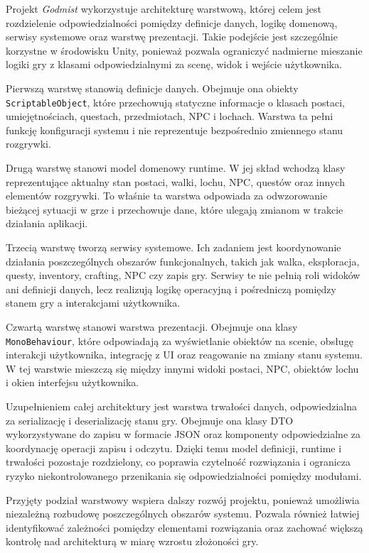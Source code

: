 Projekt \emph{Godmist} wykorzystuje architekturę warstwową, której celem jest rozdzielenie odpowiedzialności pomiędzy definicje danych, logikę domenową, serwisy systemowe oraz warstwę prezentacji. Takie podejście jest szczególnie korzystne w środowisku Unity, ponieważ pozwala ograniczyć nadmierne mieszanie logiki gry z klasami odpowiedzialnymi za scenę, widok i wejście użytkownika.

Pierwszą warstwę stanowią definicje danych. Obejmuje ona obiekty \texttt{ScriptableObject}, które przechowują statyczne informacje o klasach postaci, umiejętnościach, questach, przedmiotach, NPC i lochach. Warstwa ta pełni funkcję konfiguracji systemu i nie reprezentuje bezpośrednio zmiennego stanu rozgrywki.

Drugą warstwę stanowi model domenowy runtime. W jej skład wchodzą klasy reprezentujące aktualny stan postaci, walki, lochu, NPC, questów oraz innych elementów rozgrywki. To właśnie ta warstwa odpowiada za odwzorowanie bieżącej sytuacji w grze i przechowuje dane, które ulegają zmianom w trakcie działania aplikacji.

Trzecią warstwę tworzą serwisy systemowe. Ich zadaniem jest koordynowanie działania poszczególnych obszarów funkcjonalnych, takich jak walka, eksploracja, questy, inventory, crafting, NPC czy zapis gry. Serwisy te nie pełnią roli widoków ani definicji danych, lecz realizują logikę operacyjną i pośredniczą pomiędzy stanem gry a interakcjami użytkownika.

Czwartą warstwę stanowi warstwa prezentacji. Obejmuje ona klasy \texttt{MonoBehaviour}, które odpowiadają za wyświetlanie obiektów na scenie, obsługę interakcji użytkownika, integrację z UI oraz reagowanie na zmiany stanu systemu. W tej warstwie mieszczą się między innymi widoki postaci, NPC, obiektów lochu i okien interfejsu użytkownika.

Uzupełnieniem całej architektury jest warstwa trwałości danych, odpowiedzialna za serializację i deserializację stanu gry. Obejmuje ona klasy DTO wykorzystywane do zapisu w formacie JSON oraz komponenty odpowiedzialne za koordynację operacji zapisu i odczytu. Dzięki temu model definicji, runtime i trwałości pozostaje rozdzielony, co poprawia czytelność rozwiązania i ogranicza ryzyko niekontrolowanego przenikania się odpowiedzialności pomiędzy modułami.

Przyjęty podział warstwowy wspiera dalszy rozwój projektu, ponieważ umożliwia niezależną rozbudowę poszczególnych obszarów systemu. Pozwala również łatwiej identyfikować zależności pomiędzy elementami rozwiązania oraz zachować większą kontrolę nad architekturą w miarę wzrostu złożoności gry.

